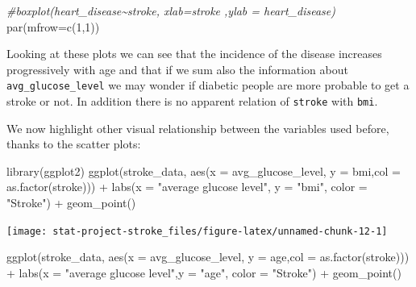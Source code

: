 \documentclass[
]{article}
\newenvironment{Shaded}{\begin{snugshade}}{\end{snugshade}}
\newcommand{\AttributeTok}[1]{\textcolor[rgb]{0.77,0.63,0.00}{#1}}
\newcommand{\CommentTok}[1]{\textcolor[rgb]{0.56,0.35,0.01}{\textit{#1}}}
\newcommand{\DecValTok}[1]{\textcolor[rgb]{0.00,0.00,0.81}{#1}}
\newcommand{\FunctionTok}[1]{\textcolor[rgb]{0.00,0.00,0.00}{#1}}
\newcommand{\NormalTok}[1]{#1}
\newcommand{\SpecialCharTok}[1]{\textcolor[rgb]{0.00,0.00,0.00}{#1}}
\newcommand{\StringTok}[1]{\textcolor[rgb]{0.31,0.60,0.02}{#1}}
\begin{document}
\begin{Shaded}
\begin{Highlighting}[]
\CommentTok{\#boxplot(heart\_disease\textasciitilde{}stroke, xlab=\textquotesingle{}stroke\textquotesingle{} ,ylab = \textquotesingle{}heart\_disease\textquotesingle{})}
\FunctionTok{par}\NormalTok{(}\AttributeTok{mfrow=}\FunctionTok{c}\NormalTok{(}\DecValTok{1}\NormalTok{,}\DecValTok{1}\NormalTok{))}
\end{Highlighting}
\end{Shaded}

Looking at these plots we can see that the incidence of the disease
increases progressively with age and that if we sum also the information
about \texttt{avg\_glucose\_level} we may wonder if diabetic people are
more probable to get a stroke or not. In addition there is no apparent
relation of \texttt{stroke} with \texttt{bmi}.

We now highlight other visual relationship between the variables used
before, thanks to the scatter plots:

\begin{Shaded}
\begin{Highlighting}[]
\FunctionTok{library}\NormalTok{(ggplot2)}
\FunctionTok{ggplot}\NormalTok{(stroke\_data, }\FunctionTok{aes}\NormalTok{(}\AttributeTok{x =}\NormalTok{ avg\_glucose\_level, }\AttributeTok{y =}\NormalTok{ bmi,}\AttributeTok{col =} \FunctionTok{as.factor}\NormalTok{(stroke))) }\SpecialCharTok{+}
  \FunctionTok{labs}\NormalTok{(}\AttributeTok{x =} \StringTok{"average glucose level"}\NormalTok{, }\AttributeTok{y =} \StringTok{"bmi"}\NormalTok{, }\AttributeTok{color =} \StringTok{"Stroke"}\NormalTok{) }\SpecialCharTok{+} \FunctionTok{geom\_point}\NormalTok{()}
\end{Highlighting}
\end{Shaded}

\begin{center}\texttt{[image: stat-project-stroke\_files/figure-latex/unnamed-chunk-12-1]} \end{center}

\begin{Shaded}
\begin{Highlighting}[]
\FunctionTok{ggplot}\NormalTok{(stroke\_data, }\FunctionTok{aes}\NormalTok{(}\AttributeTok{x =}\NormalTok{ avg\_glucose\_level, }\AttributeTok{y =}\NormalTok{ age,}\AttributeTok{col =} \FunctionTok{as.factor}\NormalTok{(stroke))) }\SpecialCharTok{+} 
  \FunctionTok{labs}\NormalTok{(}\AttributeTok{x =} \StringTok{"average glucose level"}\NormalTok{,}\AttributeTok{y =} \StringTok{"age"}\NormalTok{, }\AttributeTok{color =} \StringTok{"Stroke"}\NormalTok{) }\SpecialCharTok{+} \FunctionTok{geom\_point}\NormalTok{()}
\end{Highlighting}
\end{Shaded}
\end{document}
